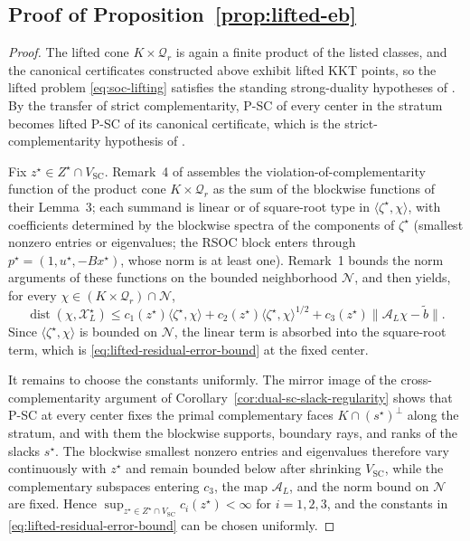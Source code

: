 \documentclass[letterpaper]{article} %
\theoremstyle{definition}
\theoremstyle{remark}
\begin{document}
\subsection{Proof of Proposition~\ref{prop:lifted-eb}}
\label{app:proof-lifted-eb}

\begin{proof}
The lifted cone $K\times\mathcal Q_r$ is again a finite product of the
listed classes, and the canonical certificates constructed above exhibit
lifted KKT points, so the lifted problem \eqref{eq:soc-lifting} satisfies
the standing strong-duality hypotheses of \cite{ding2023strict}.  By the
transfer of strict complementarity, P-SC of every center in the stratum
becomes lifted P-SC of its canonical certificate, which is the
strict-complementarity hypothesis of \cite[Corollary~1]{ding2023strict}.

Fix $z^\star\in Z^\star\cap V_{\mathrm{SC}}$.  Remark~4 of
\cite{ding2023strict} assembles the violation-of-complementarity function
of the product cone $K\times\mathcal Q_r$ as the sum of the blockwise
functions of their Lemma~3; each summand is linear or of square-root type
in $\langle\zeta^\star,\chi\rangle$, with coefficients determined by the
blockwise spectra of the components of $\zeta^\star$ (smallest nonzero
entries or eigenvalues; the RSOC block enters through
$p^\star=(1,u^\star,-Bx^\star)$, whose norm is at least one).  Remark~1
bounds the norm arguments of these functions on the bounded neighborhood
$\mathcal N$, and \cite[Corollary~1]{ding2023strict} then yields, for every
$\chi\in(K\times\mathcal Q_r)\cap\mathcal N$,
\[
    \operatorname{dist}(\chi,\mathcal X_L^\star)
    \le
    c_1(z^\star)\langle\zeta^\star,\chi\rangle
    +c_2(z^\star)\langle\zeta^\star,\chi\rangle^{1/2}
    +c_3(z^\star)\|\mathcal A_L\chi-\widetilde b\|.
\]
Since $\langle\zeta^\star,\chi\rangle$ is bounded on $\mathcal N$, the
linear term is absorbed into the square-root term, which is
\eqref{eq:lifted-residual-error-bound} at the fixed center.

It remains to choose the constants uniformly.  The mirror image of the
cross-complementarity argument of
Corollary~\ref{cor:dual-sc-slack-regularity} shows that P-SC at every
center fixes the primal complementary faces $K\cap(s^\star)^\perp$ along
the stratum, and with them the blockwise supports, boundary rays, and
ranks of the slacks $s^\star$.  The blockwise smallest nonzero entries and
eigenvalues therefore vary continuously with $z^\star$ and remain bounded
below after shrinking $V_{\mathrm{SC}}$, while the complementary
subspaces entering $c_3$, the map $\mathcal A_L$, and the norm bound on
$\mathcal N$ are fixed.  Hence
$\sup_{z^\star\in Z^\star\cap V_{\mathrm{SC}}}c_i(z^\star)<\infty$ for
$i=1,2,3$, and the constants in
\eqref{eq:lifted-residual-error-bound} can be chosen uniformly.
\end{proof}
\end{document}
